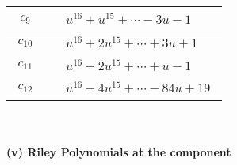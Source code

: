 \documentclass[1p]{elsarticle_modified}
\theoremstyle{definition}
\begin{document}
\begin{tabular}{m{50pt}|m{274pt}}
\hline $$\begin{aligned}c_{9}\end{aligned}$$&$\begin{aligned}
&u^{16}+u^{15}+\cdots-3 u-1
\end{aligned}$\\
\hline $$\begin{aligned}c_{10}\end{aligned}$$&$\begin{aligned}
&u^{16}+2 u^{15}+\cdots+3 u+1
\end{aligned}$\\
\hline $$\begin{aligned}c_{11}\end{aligned}$$&$\begin{aligned}
&u^{16}-2 u^{15}+\cdots+u-1
\end{aligned}$\\
\hline $$\begin{aligned}c_{12}\end{aligned}$$&$\begin{aligned}
&u^{16}-4 u^{15}+\cdots-84 u+19
\end{aligned}$\\
\hline
\end{tabular}\\~\\
\newpage\renewcommand{\arraystretch}{1}
\flushleft \textbf{(v) Riley Polynomials at the component}\newline \\
\end{document}
